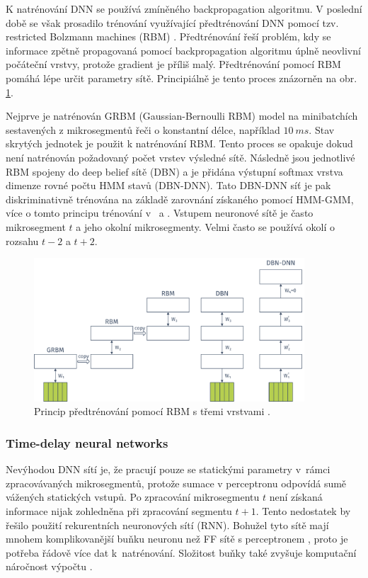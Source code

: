 K natrénování DNN se používá zmíněného backpropagation algoritmu. V poslední době se však prosadilo trénování využívající předtrénování DNN pomocí tzv. restricted Bolzmann machines (RBM) \cite{Hinton2012}. Předtrénování řeší problém, kdy se informace zpětně propagovaná pomocí backpropagation algoritmu úplně neovlivní počáteční vrstvy, protože gradient je příliš malý. Předtrénování pomocí RBM pomáhá lépe určit parametry sítě. Principiálně je tento proces znázorněn na obr. \ref{fig:asr:acoustic:dnn:pretraining}.

Nejprve je natrénován GRBM (Gaussian-Bernoulli RBM) model na minibatchích sestavených z mikrosegmentů řeči o konstantní délce, například $10\ ms$. Stav skrytých jednotek je použit k natrénování RBM. Tento proces se opakuje dokud není natrénován požadovaný počet vrstev výsledné sítě. Následně jsou jednotlivé RBM spojeny do deep belief sítě (DBN) a je přidána výstupní softmax vrstva dimenze rovné počtu HMM stavů (DBN-DNN). Tato DBN-DNN síť je pak diskriminativně trénována na základě zarovnání získaného pomocí HMM-GMM, více o tomto principu trénování v~\cite{Hinton2012} a \cite{Vesely2013}. Vstupem neuronové sítě je často mikrosegment $t$ a jeho okolní mikrosegmenty. Velmi často se používá okolí o rozsahu $t-2$ a $t+2$.

\begin{figure}[hbpt]
  \centering
  \includegraphics[width=0.9\textwidth]{./ch4-asr/img/pretraining.pdf}
  \caption{Princip předtrénování pomocí RBM s třemi vrstvami \cite{Hinton2012}.}
  \label{fig:asr:acoustic:dnn:pretraining}
\end{figure}

\subsubsection{Time-delay neural networks}

Nevýhodou DNN sítí je, že pracují pouze se statickými parametry v~rámci zpracovávaných mikrosegmentů, protože sumace v perceptronu odpovídá sumě vážených statických vstupů. Po zpracování mikrosegmentu $t$ není získaná informace nijak zohledněna při zpracování segmentu $t+1$. Tento nedostatek by řešilo použití rekurentních neuronových sítí (RNN). Bohužel tyto sítě mají mnohem komplikovanější buňku neuronu než FF sítě s perceptronem \cite{Amodei2016}, proto je potřeba řádově více dat k~natrénování. Složitost buňky také zvyšuje komputační náročnost výpočtu \cite{Hannun2014}.

